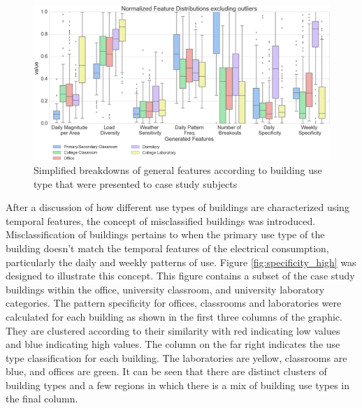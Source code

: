 
\begin{figure}[ht!]
\begin{center}
\includegraphics[width=0.98\columnwidth]{figures/buildingusecharacterization/buildingusecharacterization}
\caption{{Simplified breakdowns of general features according to building use type that were presented to case study subjects
\label{fig:buildingusebreakdownforcasestudies}%
}}
\end{center}
\end{figure}

After a discussion of how different use types of buildings are characterized using temporal features, the concept of misclassified buildings was introduced. Misclassification of buildings pertains to when the primary use type of the building doesn't match the temporal features of the electrical consumption, particularly the daily and weekly patterns of use. Figure \ref{fig:specificity_high} was designed to illustrate this concept. This figure contains a subset of the case study buildings within the office, university classroom, and university laboratory categories. The pattern specificity for offices, classrooms and laboratories were calculated for each building as shown in the first three columns of the graphic. They are clustered according to their similarity with red indicating low values and blue indicating high values. The column on the far right indicates the use type classification for each building. The laboratories are yellow, classrooms are blue, and offices are green. It can be seen that there are distinct clusters of building types and a few regions in which there is a mix of building use types in the final column. 

